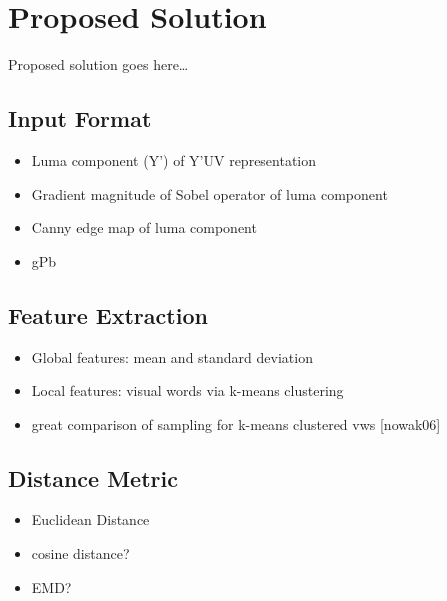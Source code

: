 \chapter{Proposed Solution}\label{ch:solution}
Proposed solution goes here\dots

\section{Input Format}
\begin{itemize}
    \item Luma component (Y') of Y'UV representation
    \item Gradient magnitude of Sobel operator of luma component
    \item Canny edge map of luma component
    \item gPb
\end{itemize}

\section{Feature Extraction}
\begin{itemize}
    \item Global features: mean and standard deviation
    \item Local features: visual words via k-means clustering
    \item great comparison of sampling for k-means clustered vws [nowak06]
\end{itemize}

\section{Distance Metric}
\begin{itemize}
    \item Euclidean Distance
    \item cosine distance?
    \item EMD?
\end{itemize}

